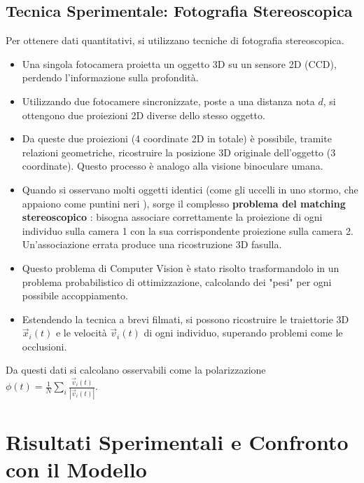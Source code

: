\subsection{Tecnica Sperimentale: Fotografia Stereoscopica}
Per ottenere dati quantitativi, si utilizzano tecniche di fotografia stereoscopica.
\begin{itemize}
    \item Una singola fotocamera proietta un oggetto 3D su un sensore 2D (CCD), perdendo l'informazione sulla profondità.
    \item Utilizzando due fotocamere sincronizzate, poste a una distanza nota $d$, si ottengono due proiezioni 2D diverse dello stesso oggetto.
    \item Da queste due proiezioni (4 coordinate 2D in totale) è possibile, tramite relazioni geometriche, ricostruire la posizione 3D originale dell'oggetto (3 coordinate). Questo processo è analogo alla visione binoculare umana.
    \item Quando si osservano molti oggetti identici (come gli uccelli in uno stormo, che appaiono come puntini neri ), sorge il complesso \textbf{problema del matching stereoscopico} : bisogna associare correttamente la proiezione di ogni individuo sulla camera 1 con la sua corrispondente proiezione sulla camera 2. Un'associazione errata produce una ricostruzione 3D fasulla.
    \item Questo problema di Computer Vision è stato risolto trasformandolo in un problema probabilistico di ottimizzazione, calcolando dei "pesi" per ogni possibile accoppiamento.
    \item Estendendo la tecnica a brevi filmati, si possono ricostruire le traiettorie 3D $\vec{x}_i(t)$ e le velocità $\vec{v}_i(t)$ di ogni individuo, superando problemi come le occlusioni.
\end{itemize}
Da questi dati si calcolano osservabili come la polarizzazione $\phi(t) = \frac{1}{N} \sum_i \frac{\vec{v}_i(t)}{|\vec{v}_i(t)|}$.

\section{Risultati Sperimentali e Confronto con il Modello}


